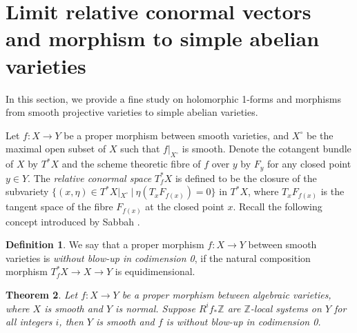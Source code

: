 \documentclass[a4paper,12pt,reqno]{amsart}
\newtheorem{theorem}{Theorem}[section]
\theoremstyle{question}
\theoremstyle{definition}
\newtheorem{definition}[theorem]{Definition}
\theoremstyle{remark}
\theoremstyle{cited}
\theoremstyle{citeddef}
\begin{document}
\section{Limit relative conormal vectors and morphism to simple abelian varieties}\label{sect:smooth-mor-simpleAV-1-form}

In this section, we provide a fine study on holomorphic 1-forms and morphisms from smooth projective varieties to simple abelian varieties.

Let $f\colon X\to Y$ be a proper morphism between smooth varieties, and $X^\circ$ be the maximal open subset of $X$ such that $f|_{X^\circ}$ is smooth.
Denote the cotangent bundle of $X$ by $T^*X$ and the scheme theoretic fibre of $f$ over $y$ by $F_y$ for any closed point $y\in Y$. The \textit{relative conormal  space} $T_f^*X$ is defined to be the closure of the subvariety $\{ (x,\eta)\in T^*X|_{X^\circ} \  | \  \eta(T_xF_{f(x)} ) = 0   \}$ in $T^*X$, where $T_xF_{f(x)}$ is the tangent space of the fibre $F_{f(x)}$ at the closed point $x$. Recall the following concept introduced by Sabbah \cite[Definition 3.1]{Sab85}.


\begin{definition}\label{sans  \'eclatement en codimension 0}
We say that a proper morphism $f\colon X\to Y$ between smooth varieties is \textit{without blow-up  in codimension 0}, if the natural composition morphism $T^*_fX\to X\to Y$ is equidimensional.
\end{definition}



\begin{theorem}\label{thm:homological-trivial-deformation-no-blow-up-codim0}
  Let $f\colon X\to Y$ be a proper morphism between algebraic varieties, where $X$ is smooth and $Y$ is normal. Suppose $R^if_*\mathbb{Z}$ are $\mathbb{Z}$-local systems on $Y$ for all integers $i$, then $Y$ is smooth and $f$ is without blow-up in codimension 0.
\end{theorem}
\end{document}

